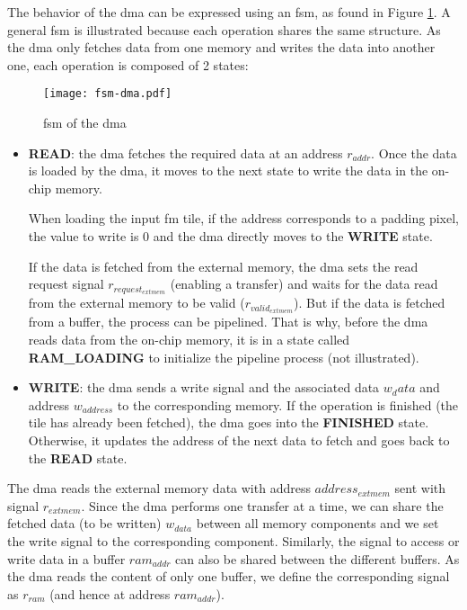 The behavior of the \acrshort{dma} can be expressed using an \acrshort{fsm}, as found in Figure \ref{fig:fsm_dma}. A general \acrshort{fsm} is illustrated because each operation shares the same structure. As the \acrshort{dma} only fetches data from one memory and writes the data into another one, each operation is composed of 2 states:
%
\begin{figure}[H]
    \centering
    \texttt{[image: fsm-dma.pdf]}
    \caption{\acrshort{fsm} of the \acrshort{dma}}
    \label{fig:fsm_dma}
\end{figure}
%
\begin{itemize}
    \item \textbf{READ}: the \acrshort{dma} fetches the required data at an address $r_{addr}$. Once the data is loaded by the \acrshort{dma}, it moves to the next state to write the data in the on-chip memory. 
    
    When loading the input \acrshort{fm} tile, if the address corresponds to a padding pixel, the value to write is 0 and the \acrshort{dma} directly moves to the \textbf{WRITE} state. 
    
    If the data is fetched from the external memory, the \acrshort{dma} sets the read request signal $r_{request_{extmem}}$ (enabling a transfer) and waits for the data read from the external memory to be valid ($r_{valid_{extmem}}$). But if the data is fetched from a buffer, the process can be pipelined. That is why, before the \acrshort{dma} reads data from the on-chip memory, it is in a state called \textbf{RAM\_LOADING} to initialize the pipeline process (not illustrated).
    \item \textbf{WRITE}: the \acrshort{dma} sends a write signal and the associated data $w_data$ and address $w_{address}$ to the corresponding memory. If the operation is finished (the tile has already been fetched), the \acrshort{dma} goes into the \textbf{FINISHED} state. Otherwise, it updates the address of the next data to fetch and goes back to the \textbf{READ} state.
\end{itemize}

The \acrshort{dma} reads the external memory data with address $address_{extmem}$ sent with signal $r_{extmem}$. Since the \acrshort{dma} performs one transfer at a time, we can share the fetched data (to be written) $w_{data}$ between all memory components and we set the write signal to the corresponding component. Similarly, the signal to access or write data in a buffer $ram_{addr}$ can also be shared between the different buffers. As the \acrshort{dma} reads the content of only one buffer, we define the corresponding signal as $r_{ram}$ (and hence at address $ram_{addr}$).
%
